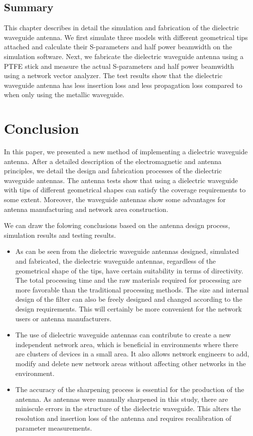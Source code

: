 \documentclass[a4paper,12pt]{report}
\begin{document}
\section{Summary}

This chapter describes in detail the simulation
and fabrication of the dielectric waveguide antenna.
We first simulate three models with different geometrical tips attached
and calculate their S-parameters and half power beamwidth
on the simulation software.
Next, we fabricate the dielectric waveguide antenna using
a PTFE stick and measure the actual S-parameters and half power
beamwidth using a network vector analyzer.
The
test results show that the dielectric waveguide antenna has
less insertion loss and less propagation loss compared to
when only using the metallic waveguide.

\chapter{Conclusion}

In this paper,
we presented a new method of implementing a dielectric waveguide antenna.
After a detailed
description of the electromagnetic and antenna principles,
we detail the design
and fabrication processes of the dielectric waveguide antennas.
The antenna tests show that
using a dielectric waveguide with tips of different geometrical shapes
can satisfy the coverage requirements to some extent.
Moreover,
the waveguide antennas show some advantages for antenna manufacturing and
network area construction.

We can draw the folowing conclusions based on the
antenna design process, simulation results and testing results.

\begin{itemize}
  \item As can be seen from the dielectric waveguide antennas
  designed, simulated and fabricated,
  the dielectric waveguide antennas,
  regardless of the geometrical shape of the tips,
  have certain suitability in terms of directivity.
  The total processing time and
  the raw materials required for processing are more favorable than the
  traditional processing methods.
  The size and internal design of the
  filter can also be freely designed and changed according to the design
  requirements. This will certainly be more convenient for the
  network users or antenna manufacturers.
  \item The use of dielectric waveguide antennas can contribute
  to create a new independent network area,
  which is beneficial in environments where there are
  clusters of devices in a small area.
  It also allows network engineers to
  add, modify and delete new network areas without
  affecting other networks in the environment.
  \item The accuracy of the sharpening process is essential
  for the production of the antenna.
  As antennas were manually sharpened in this study,
  there are miniscule errors in the structure of the dielectric waveguide.
  This alters the resolution and insertion loss of the antenna
  and requires recalibration of parameter measurements.
\end{itemize}
\end{document}
